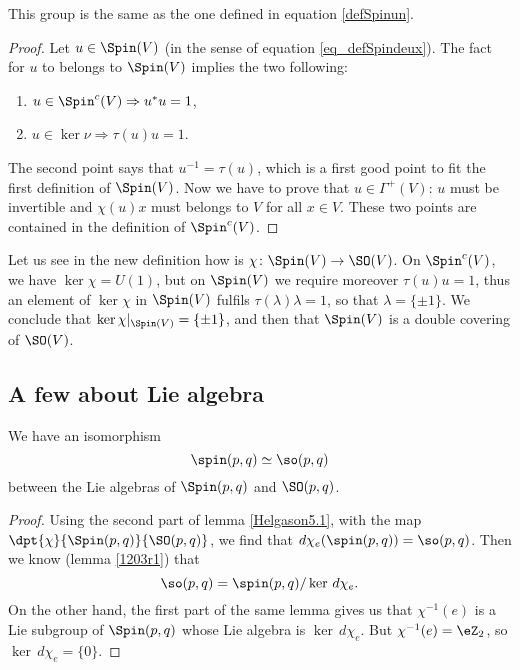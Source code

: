 \begin{lemma}
This group is the same as the one defined in equation \eqref{defSpinun}. 
\end{lemma}

\begin{proof}
Let $u\in\Spin(V)$ (in the sense of equation \eqref{eq_defSpindeux}). The fact for $u$ to belongs to $\Spin(V)$ implies the two following:
\begin{enumerate}
\item $u\in\Spin^{c}(V)\Rightarrow u^*u=1$,
\item $u\in\ker\nu\Rightarrow \tau(u)u=1$.
\end{enumerate}
The second point says that $u^{-1}=\tau(u)$, which is a first good point to fit the first definition of $\Spin(V)$. Now we have to prove that $u\in\Gamma^{+}(V)$: $u$ must be invertible and $\chi(u)x$ must belongs to $V$ for all $x\in V$. These two points are contained in the definition of $\Spin^{c}(V)$.
\end{proof}
Let us see in the new definition how is $\chi\colon \Spin(V)\to \SO(V)$. On $\Spin^{c}(V)$, we have $\ker\chi=U(1)$, but on $\Spin(V)$ we require moreover $\tau(u)u=1$, thus an element of $\ker\chi$ in $\Spin(V)$ fulfils $\tau(\lambda)\lambda=1$, so that $\lambda=\{ \pm1 \}$. We conclude that $\ker\chi|_{\Spin(V)}=\{ \pm 1 \}$, and then that $\Spin(V)$ is a double covering of $\SO(V)$.


\subsection{A few about Lie algebra}

\begin{proposition}
We have an isomorphism
\[ 
                    \spin(p,q)\simeq\so(p,q)
\]
between the Lie algebras of $\Spin(p,q)$ and $\SO(p,q)$.
\label{prop:spin_so}   
\end{proposition}

\begin{proof}
Using the second part of lemma \ref{Helgason5.1}, with the map $\dpt{\chi}{\Spin(p,q)}{\SO(p,q)}$, we find that $d\chi_e(\spin(p,q))=\so(p,q)$. Then we know (lemma \ref{1203r1}) that 
\[
	\so(p,q)=\spin(p,q)/\ker\,d\chi_e.
\]
On the other hand, the first part of the same lemma gives us that $\chi^{-1}(e)$ is a Lie subgroup of $\Spin(p,q)$ whose Lie algebra is $\ker\,d\chi_e$. But $\chi^{-1}(e)=\eZ_2$, so $\ker\,d\chi_e=\{0\}$.
\end{proof}

